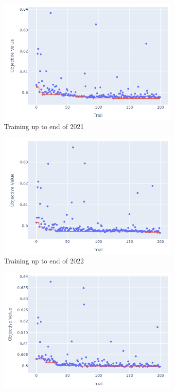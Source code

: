 \documentclass[12pt,twoside]{report}
\begin{document}
\begin{figure}[htb]
\begin{subfigure}{.33\linewidth}
  \includegraphics[width=0.95\linewidth]{figures/lightgbm_cutoff_2021.png}
  \caption{Training up to end of 2021}
\end{subfigure}
\par\bigskip
\par\bigskip
\begin{subfigure}{.33\linewidth}
  \centering
  \includegraphics[width=0.95\linewidth]{figures/lightgbm_cutoff_2022.png}
  \caption{Training up to end of 2022}
\end{subfigure}%
\begin{subfigure}{.33\linewidth}
  \centering
  \includegraphics[width=0.95\linewidth]{figures/lightgbm_cutoff_2023.png}

\end{subfigure}
\end{figure}
\end{document}
